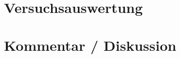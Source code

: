 \documentclass[a4 paper, 11pt]{article}
\begin{document}
\section{Versuchsauswertung}
\section{Kommentar / Diskussion}
\end{document}
